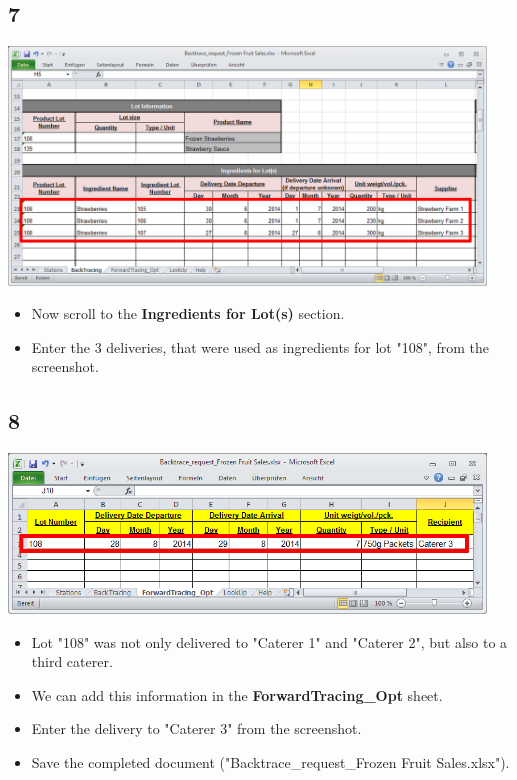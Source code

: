 \documentclass{beamer}
\begin{document}
\subsection{7}
\begin{frame}
	\begin{center}
  		\includegraphics[width=0.95\textwidth]{7.png}
	\end{center}
	\begin{itemize}
		\item Now scroll to the \textbf{Ingredients for Lot(s)} section.
		\item Enter the 3 deliveries, that were used as ingredients for lot "108", from the screenshot.
	\end{itemize}
\end{frame}

\subsection{8}
\begin{frame}
	\begin{center}
  		\includegraphics[width=0.95\textwidth]{8.png}
	\end{center}
	\begin{itemize}
		\item Lot "108" was not only delivered to "Caterer 1" and "Caterer 2", but also to a third caterer.
		\item We can add this information in the \textbf{ForwardTracing\_Opt} sheet.
		\item Enter the delivery to "Caterer 3" from the screenshot.
		\item Save the completed document ("Backtrace\_request\_Frozen Fruit Sales.xlsx").
	\end{itemize}
\end{frame}
\end{document}
